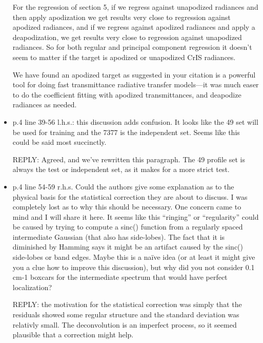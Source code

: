 \documentclass[11pt]{article}
\newcommand {\reply} {\mbox{\small REPLY}}
\begin{document}
\begin{itemize}
  For the regression of section 5, if we regress against unapodized
  radiances and then apply apodization we get results very close to
  regression against apodized radiances, and if we regress against
  apodized radiances and apply a deapodization, we get results very
  close to regression against unapodized radiances.  So for both
  regular and principal component regression it doesn't seem to
  matter if the target is apodized or unapodized CrIS radiances.

  We have found an apodized target as suggested in your citation is
  a powerful tool for doing fast transmittance radiative transfer
  models---it was much easer to do the coefficient fitting with
  apodized transmittances, and deapodize radiances as needed.
  

\item p.4 line 39-56 l.h.s.: this discussion adds confusion. It
  looks like the 49 set will be used for training and the 7377 is
  the independent set. Seems like this could be said most
  succinctly.

  \reply: Agreed, and we've rewritten this paragraph.  The 49
  profile set is always the test or independent set, as it makes for
  a more strict test.

\item p.4 line 54-59 r.h.s. Could the authors give some explanation
  as to the physical basis for the statistical correction they are
  about to discuss. I was completely lost as to why this should be
  necessary. One concern came to mind and I will share it here. It
  seems like this ``ringing'' or ``regularity'' could be caused by
  trying to compute a sinc() function from a regularly spaced
  intermediate Gaussian (that also has side-lobes). The fact that it
  is diminished by Hamming says it might be an artifact caused by
  the sinc() side-lobes or band edges. Maybe this is a naïve idea
  (or at least it might give you a clue how to improve this
  discussion), but why did you not consider 0.1 cm-1 boxcars for the
  intermediate spectrum that would have perfect localization?

  \reply: the motivation for the statistical correction was simply
  that the residuals showed some regular structure and the standard
  deviation was relativly small.  The deconvolution is an imperfect
  process, so it seemed plausible that a correction might help.


\end{itemize}
\end{document}
